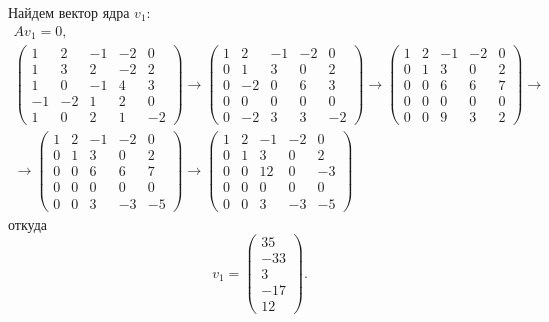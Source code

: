\documentclass[12pt]{article}
\begin{document}
    Найдем вектор ядра $v_1$:
    \begin{gather*}
        A v_1 = 0, \\
        \begin{pmatrix}
            1  & 2  & -1 & -2 & 0  \\
            1  & 3  & 2  & -2 & 2  \\
            1  & 0  & -1 & 4  & 3  \\
            -1 & -2 & 1  & 2  & 0  \\
            1  & 0  & 2  & 1  & -2
        \end{pmatrix}
        \rightarrow
        \begin{pmatrix}
            1 & 2  & -1 & -2 & 0  \\
            0 & 1  & 3  & 0  & 2  \\
            0 & -2 & 0  & 6  & 3  \\
            0 & 0  & 0  & 0  & 0  \\
            0 & -2 & 3  & 3  & -2
        \end{pmatrix}
        \rightarrow
        \begin{pmatrix}
            1 & 2 & -1 & -2 & 0 \\
            0 & 1 & 3  & 0  & 2 \\
            0 & 0 & 6  & 6  & 7 \\
            0 & 0 & 0  & 0  & 0 \\
            0 & 0 & 9  & 3  & 2
        \end{pmatrix}
        \rightarrow \\
        \rightarrow
        \begin{pmatrix}
            1 & 2 & -1 & -2 & 0  \\
            0 & 1 & 3  & 0  & 2  \\
            0 & 0 & 6  & 6  & 7  \\
            0 & 0 & 0  & 0  & 0  \\
            0 & 0 & 3  & -3 & -5
        \end{pmatrix}
        \rightarrow
        \begin{pmatrix}
            1 & 2 & -1 & -2 & 0  \\
            0 & 1 & 3  & 0  & 2  \\
            0 & 0 & 12 & 0  & -3 \\
            0 & 0 & 0  & 0  & 0  \\
            0 & 0 & 3  & -3 & -5
        \end{pmatrix}
    \end{gather*}
    откуда
    \[
        v_1 = \begin{pmatrix}
                  35 \\ -33 \\ 3 \\ -17 \\ 12
        \end{pmatrix} .
    \]
\end{document}
